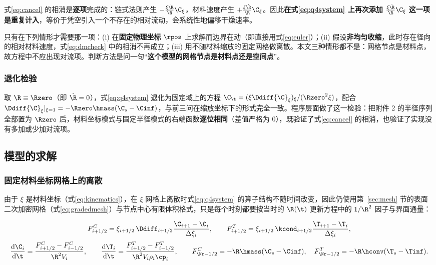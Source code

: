 式\eqref{eq:cancel} 的相消是\textbf{逐项}完成的：链式法则产生 $-\frac{\xi\dot \R}{\R}{\C}_\xi$，材料速度产生 $+\frac{\xi\dot \R}{\R}{\C}_\xi$。因此\textbf{在式\eqref{eq:q4system} 上再次添加 $\frac{\xi\dot \R}{\R}{\C}_\xi$ 这一项是重复计入}，等价于凭空引入一个不存在的相对流动，会系统性地偏移干燥速率。

只有在下列情形才需要那一项：(i) 在\textbf{固定物理坐标} $\rpos$ 上求解而边界在动（即直接用式\eqref{eq:euler}）；(ii) 假设\textbf{非均匀收缩}，此时存在径向的相对材料速度，式\eqref{eq:dmcheck} 中的相消不再成立；(iii) 用不随材料缩放的固定网格做离散。本文三种情形都不是：网格节点是材料点，故方程中不应出现对流项。判断方法是问一句``\textbf{这个模型的网格节点是材料点还是空间点}''。

\subsubsection{退化检验}

取 $\R\equiv\Rzero$（即 $\dot \R=0$），式\eqref{eq:q4system} 退化为固定域上的方程 ${\C}_\t=(\xi\Ddiff{\C}_\xi)_\xi/({\Rzero}^2\xi)$，配合 $\Ddiff{\C}_\xi|_{\xi=1}=-\Rzero\hmass({\C}_s-\Cinf)$，与前三问在缩放坐标下的形式完全一致。程序层面做了这一检验：把附件 2 的半径序列全部置为 $\Rzero$ 后，材料坐标模式与固定半径模式的右端函数\textbf{逐位相同}（差值严格为 $0$），既验证了式\eqref{eq:cancel} 的相消，也验证了实现没有多加或少加对流项。

\subsection{模型的求解}
\label{sec:q4solve}

\subsubsection{固定材料坐标网格上的离散}

由于 $\xi$ 是材料坐标（式\eqref{eq:kinematics}），在 $\xi$ 网格上离散时式\eqref{eq:q4system} 的算子结构不随时间改变，因此仍使用第~\ref{sec:mesh} 节的表面二次加密网格（式\eqref{eq:gradedmesh}）与节点中心有限体积格式，只是每个时刻都要按当时的 $\R(\t)$ 更新方程中的 $1/{\R}^2$ 因子与界面通量：

\begin{equation}
F^C_{i+1/2}=\xi_{i+1/2}\,{\Ddiff}_{i+1/2}\frac{{\C}_{i+1}-{\C}_i}{\Delta\xi_i},
\qquad
F^T_{i+1/2}=\xi_{i+1/2}\,{\kcond}_{i+1/2}\frac{{\T}_{i+1}-{\T}_i}{\Delta\xi_i},
\end{equation}
\begin{equation}
\frac{\mathrm{d}{\C}_i}{\mathrm{d}\t}=\frac{F^C_{i+1/2}-F^C_{i-1/2}}{{\R}^2V_i},
\qquad
\frac{\mathrm{d}{\T}_i}{\mathrm{d}\t}=\frac{F^T_{i+1/2}-F^T_{i-1/2}}{{\R}^2V_i\rho_i{\cp}_i},
\qquad
F^C_{\Nr-1/2}=-\R\hmass({\C}_s-\Cinf),\quad F^T_{\Nr-1/2}=-\R\hconv({\T}_s-\Tinf).
\end{equation}

